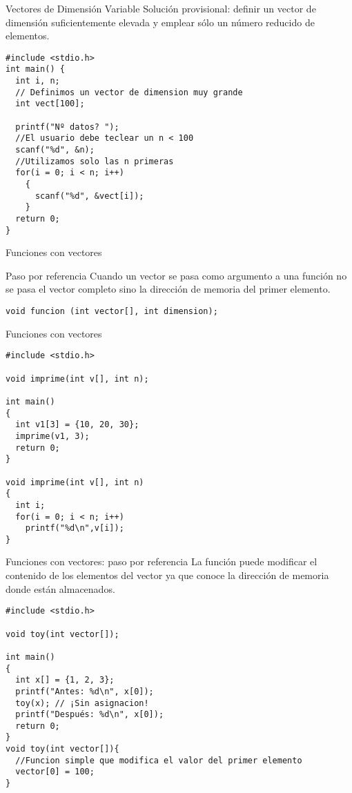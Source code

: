 \documentclass[xcolor={usenames,svgnames,dvipsnames}, aspectratio=169]{beamer}
\begin{document}
\begin{frame}[label={sec:org8bf2929},fragile]{Vectores de Dimensión Variable}
 \alert{Solución provisional}: definir un vector de dimensión suficientemente elevada y emplear sólo un número reducido de elementos.
\lstset{language=C,label= ,caption= ,captionpos=b,numbers=none}
\begin{lstlisting}
#include <stdio.h>
int main() {
  int i, n;
  // Definimos un vector de dimension muy grande
  int vect[100];

  printf("Nº datos? ");
  //El usuario debe teclear un n < 100
  scanf("%d", &n); 
  //Utilizamos solo las n primeras
  for(i = 0; i < n; i++) 
    {
      scanf("%d", &vect[i]);
    }
  return 0;
}
\end{lstlisting}
\end{frame}
\begin{frame}[label={sec:org5910cfd},fragile]{Funciones con vectores}
 \begin{block}{Paso por referencia}
Cuando un vector se pasa como argumento a una función \alert{no se pasa el vector completo} sino la \alert{dirección de memoria del primer elemento}.
\lstset{language=C,label= ,caption= ,captionpos=b,numbers=none}
\begin{lstlisting}
void funcion (int vector[], int dimension);
\end{lstlisting}
\end{block}
\end{frame}

\begin{frame}[label={sec:orge7a8d19},fragile]{Funciones con vectores}
 \lstset{language=C,label= ,caption= ,captionpos=b,numbers=none}
\begin{lstlisting}
#include <stdio.h>

void imprime(int v[], int n);

int main()
{
  int v1[3] = {10, 20, 30};
  imprime(v1, 3);
  return 0;
} 

void imprime(int v[], int n)
{
  int i;
  for(i = 0; i < n; i++)
    printf("%d\n",v[i]);
}
\end{lstlisting}
\end{frame}

\begin{frame}[label={sec:org8b0155d},fragile,plain]{Funciones con vectores: paso por referencia}
 La función \alert{puede modificar} el contenido de los elementos del vector ya que conoce la dirección de memoria donde están almacenados.

\lstset{language=C,label= ,caption= ,captionpos=b,numbers=none}
\begin{lstlisting}
#include <stdio.h>

void toy(int vector[]);

int main()
{
  int x[] = {1, 2, 3};
  printf("Antes: %d\n", x[0]);
  toy(x); // ¡Sin asignacion!
  printf("Después: %d\n", x[0]);
  return 0;
}
void toy(int vector[]){ 
  //Funcion simple que modifica el valor del primer elemento
  vector[0] = 100;
}
\end{lstlisting}
\end{frame}
\end{document}
